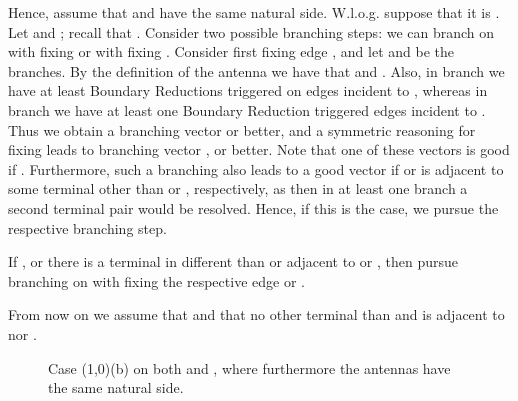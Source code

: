 Hence, assume that  and  have the same natural side. W.l.o.g. suppose that it is . Let  and ; recall that . Consider two possible branching steps: we can branch on  with fixing  or with fixing . Consider first fixing edge , and let  and  be the branches. By the definition of the antenna we have that  and . Also, in branch  we have at least  Boundary Reductions triggered on edges incident to , whereas in branch  we have at least one Boundary Reduction triggered edges incident to . Thus we obtain a branching vector  or better, and a symmetric reasoning for fixing  leads to branching vector , or better. Note that one of these vectors is good if .
Furthermore, such a branching also leads to a good vector if  or  is adjacent to some terminal other than  or , respectively,
  as then in at least one branch a second terminal pair would be resolved.
Hence, if this is the case, we pursue the respective branching step.

\begin{branching}
If , or there is a terminal in  different than  or  adjacent to  or ,
then pursue branching on  with fixing the respective edge  or .
\end{branching}

From now on we assume that  and that no other terminal than  and  is adjacent to  nor .

\begin{figure}[H]
	\centering
	\clearpage{}
\figspace
\clearpage{}
	\caption{Case (1,0)(b) on both  and , where furthermore the antennas have the same natural side.}
\label{fig:case-10-b-two-antennas}
\end{figure}


